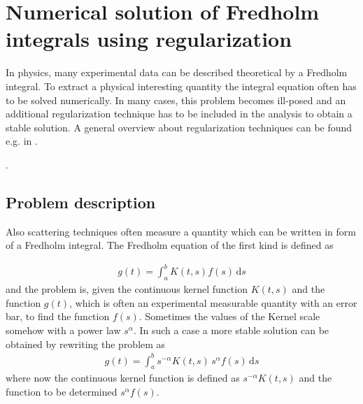 \chapter{Numerical solution of Fredholm integrals using regularization}
In physics, many experimental data can be described theoretical by a Fredholm integral. To extract a physical interesting quantity the integral equation often has to be solved numerically. In many cases, this problem becomes ill-posed and an additional regularization technique has to be included in the analysis to obtain a stable solution. A general overview about regularization techniques can be found e.g. in \cite{Hansen1998,Hansen2000b,Gazzola2018,Scherzer2011,Kern2016}.

\nocite{Benvenuto2016,Gao2016,Hansen2016,Pedersen2014,Sen2014,Blanchet2013,Mroczka2013,Paul2013,
Mroczka2013,Liu2012,Zhenhai2012,Bauer2011,Debski2010,Hansen2008,Santos2007,Wang2007,Stribeck2006,Vestergaard2006,Tatchev2004,
Hansen2003,Castellanos2002,Pike2002,Bergmann2000,Hansen2000,Hansen2000a,Elliott1999,Weyerich1999,Mittelbach1998,Mulato1998,
Brunner-Popela1997,Durchschlag1997,Mulato1997,Tsao1997,Gilmore1996,Hansen1996,Kline1996,Krauthauser1996,Muller1996,Mulato1996,
Serimaa1996,Jakes1995,Jemian1994,Ross1994,Steenstrup1994,Svergun1994,Glatter1993,Svergun1993,Morrison1992,Svergun1992,
Glatter1991,Goldin1991,Hansen1991,Semenyuk1991,Svergun1991,Jakes1991,Jakes1990,Bricogne1988,Glatter1988,Magnani1988,Potton1988,Potton1988a,
Svergun1988,Jakes1988,Thomas1987,Xu1987,Luzzati1986,Jakes1986,Livesey1985,Walter1985,Kubota1985,Bricogne1984,Glatter1984,Provencher1984,
Skilling1984,Britten1982,Kratky1982,Provencher1982,Provencher1982a,Taupin1982,Glatter1981,Glatter1980,Glatter1980b,Moore1980,Glatter1979,
Provencher1978,Glatter1977,Vonk1976,Pusey1974,Debye1915,Larsen2018,Bressler2015}.

\section{Problem description}
Also scattering techniques often measure  a quantity which can be written in form of a Fredholm integral.
The Fredholm equation of the first kind is defined as

\begin{align}
\label{eq:Fredholm}
g(t)=\int _{a}^{b}K(t,s)f(s)\,\mathrm {d} s
\end{align}
and the problem is, given the continuous kernel function $K(t,s)$ and the function $g(t)$, which is often an experimental measurable quantity with an error bar, to find the function $f(s)$. Sometimes the values of the Kernel scale somehow with a power law $s^\alpha$. In such a case a more stable solution can be obtained by rewriting the problem as
\begin{align}
\label{eq:KernelScaling}
g(t)=\int _{a}^{b}s^{-\alpha} K(t,s) \, s^{\alpha}f(s)\,\mathrm {d} s
\end{align}
where now the continuous kernel function is defined as $s^{-\alpha}K(t,s)$ and the function to be determined $s^{\alpha} f(s)$.

